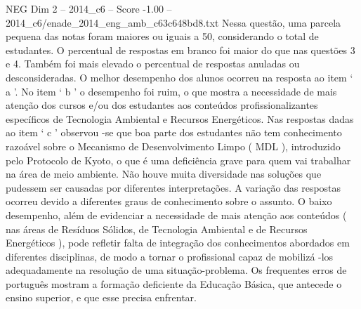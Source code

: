 \begin{textsample}{NEG Dim 2 – 2014\_c6 – Score -1.00 – 2014\_c6/enade\_2014\_eng\_amb\_c63c648bd8.txt}
Nessa questão, uma parcela pequena das notas foram maiores ou iguais a 50, considerando o total de estudantes.
O percentual de respostas em branco foi maior do que nas questões 3 e 4.
Também foi mais elevado o percentual de respostas anuladas ou desconsideradas.
O melhor desempenho dos alunos ocorreu na resposta ao item ‘ a ’.
No item ‘ b ’ o desempenho foi ruim, o que mostra a necessidade de mais atenção dos cursos e/ou dos estudantes aos conteúdos profissionalizantes específicos de Tecnologia Ambiental e Recursos Energéticos.
Nas respostas dadas ao item ‘ c ’ observou -se que boa parte dos estudantes não tem conhecimento razoável sobre o Mecanismo de Desenvolvimento Limpo ( MDL ), introduzido pelo Protocolo de Kyoto, o que é uma deficiência grave para quem vai trabalhar na área de meio ambiente.
Não houve muita diversidade nas soluções que pudessem ser causadas por diferentes interpretações.
A variação das respostas ocorreu devido a diferentes graus de conhecimento sobre o assunto.
O baixo desempenho, além de evidenciar a necessidade de mais atenção aos conteúdos ( nas áreas de Resíduos Sólidos, de Tecnologia Ambiental e de Recursos Energéticos ), pode refletir falta de integração dos conhecimentos abordados em diferentes disciplinas, de modo a tornar o profissional capaz de mobilizá -los adequadamente na resolução de uma situação-problema.
Os frequentes erros de português mostram a formação deficiente da Educação Básica, que antecede o ensino superior, e que esse precisa enfrentar.

\end{textsample}

